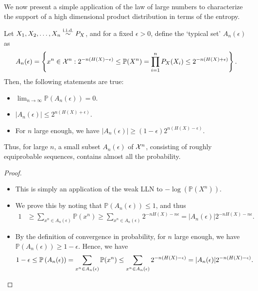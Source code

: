         We now present a simple application of the law of large numbers to characterize the support of a high dimensional product distribution in terms of the entropy.
        \begin{proposition}
            \label{prop:discrete-AEP} 
            Let $X_1, X_2, \ldots, X_n \stackrel{\text{i.i.d.}}{\sim} P_X$, and for a fixed $\epsilon >0$, define the `typical set' $A_n(\epsilon)$ as 
                \begin{align}
                    A_n(\epsilon) = \left\{ x^n\in \mathcal{X}^n: 2^{-n\left( H(X) - \epsilon \right)} \leq \mathbb{P}(X^n) = \prod_{i=1}^n P_X(X_i) \leq 2^{-n\left( H(X) + \epsilon \right)} \right\}. \label{eq:typical-set-1}
                \end{align}
                Then, the following statements are true: 
                \begin{itemize}
                    \item $\lim_{n \to \infty} \mathbb{P}(A_n(\epsilon)) = 0$. 
                    \item $|A_n(\epsilon)| \leq 2^{n(H(X) + \epsilon)}$. 
                    \item For $n$ large enough, we have $|A_n(\epsilon)| \geq (1-\epsilon)2^{n(H(X)-\epsilon)}$. 
                \end{itemize}
            Thus, for large $n$, a small subset $A_n(\epsilon)$ of $\mathcal{X}^n$, consisting of roughly equiprobable sequences, contains almost all the probability. 
        \end{proposition}
        \begin{proof}
            \begin{itemize}
                \item This is simply an application of the weak LLN to $-\log(\mathbb{P}(X^n))$.  
                \item We prove this by noting that $\mathbb{P}(A_n(\epsilon))\leq 1$, and thus 
                \begin{align}
                    1 & \geq \sum_{x^n \in A_n(\epsilon)} \mathbb{P}(x^n) \geq \sum_{x^n \in A_n(\epsilon)} 2^{-n H(X) - n\epsilon} = |A_n(\epsilon)|2^{-n H(X) - n\epsilon}. 
                \end{align}
                \item By the definition of convergence in probability, for $n$ large enough, we have $\mathbb{P}(A_n(\epsilon)) \geq 1-\epsilon$. Hence, we have 
                \begin{align}
                    1-\epsilon & \leq \mathbb{P}\left( A_n(\epsilon) \right) = \sum_{x^n \in A_n(\epsilon)} \mathbb{P}(x^n) \leq \sum_{x^n \in A_n(\epsilon)} 2^{-n(H(X) - \epsilon)} = |A_n(\epsilon)| 2^{-n(H(X) - \epsilon)}. 
                \end{align}
            \end{itemize}
        \end{proof}
